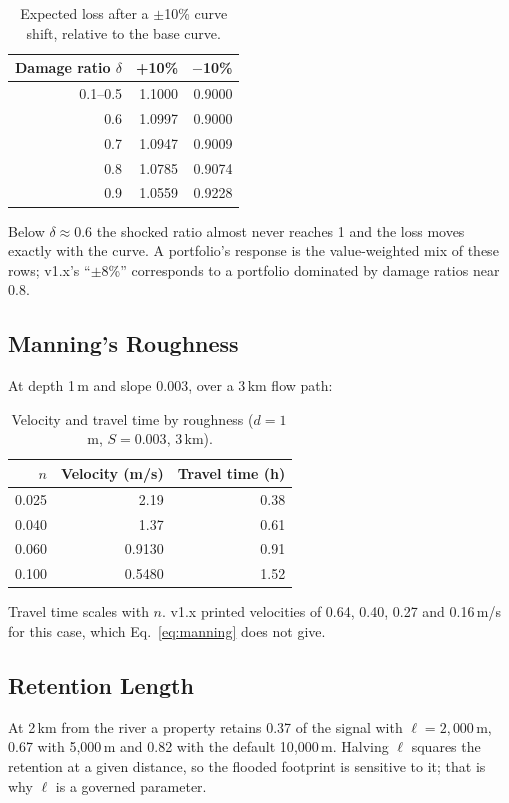 \documentclass[11pt,a4paper]{article}
\begin{document}
\begin{table}[H]
    \centering
    \caption{Expected loss after a $\pm$10\% curve shift, relative to the base curve.}
    \label{tab:sens_shift}
    \begin{tabular}{rrr}
        \toprule
        \textbf{Damage ratio $\delta$} & \textbf{+10\%} & \textbf{$-$10\%} \\
        \midrule
        0.1--0.5 & 1.1000 & 0.9000 \\
        0.6 & 1.0997 & 0.9000 \\
        0.7 & 1.0947 & 0.9009 \\
        0.8 & 1.0785 & 0.9074 \\
        0.9 & 1.0559 & 0.9228 \\
        \bottomrule
    \end{tabular}
\end{table}

\noindent Below $\delta\approx0.6$ the shocked ratio almost never reaches 1 and the loss
moves exactly with the curve. A portfolio's response is the value-weighted mix of these
rows; v1.x's ``$\pm$8\%'' corresponds to a portfolio dominated by damage ratios near 0.8.

\subsection{Manning's Roughness}
At depth 1\,m and slope 0.003, over a 3\,km flow path:

\begin{table}[H]
    \centering
    \caption{Velocity and travel time by roughness ($d=1$\,m, $S=0.003$, 3\,km).}
    \label{tab:sens_rough}
    \begin{tabular}{rrr}
        \toprule
        \textbf{$n$} & \textbf{Velocity (m/s)} & \textbf{Travel time (h)} \\
        \midrule
        0.025 & 2.19 & 0.38 \\
        0.040 & 1.37 & 0.61 \\
        0.060 & 0.9130 & 0.91 \\
        0.100 & 0.5480 & 1.52 \\
        \bottomrule
    \end{tabular}
\end{table}

\noindent Travel time scales with $n$. v1.x printed velocities of 0.64, 0.40, 0.27 and
0.16\,m/s for this case, which Eq.~\eqref{eq:manning} does not give.

\subsection{Retention Length}
At 2\,km from the river a property retains 0.37 of the signal with $\ell=2{,}000$\,m,
0.67 with 5{,}000\,m and 0.82 with the default 10{,}000\,m. Halving $\ell$ squares the
retention at a given distance, so the flooded footprint is sensitive to it; that is why
$\ell$ is a governed parameter.
\end{document}
